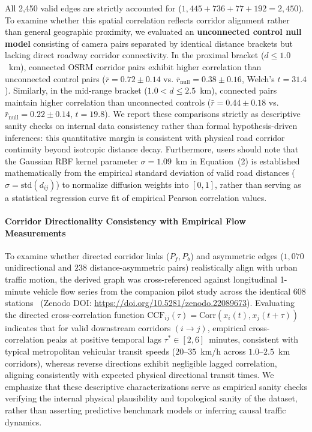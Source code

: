\documentclass[preprint,12pt]{elsarticle}
\begin{document}
All 2,450 valid edges are strictly accounted for ($1,445 + 736 + 77 + 192 = 2,450$). To examine whether this spatial correlation reflects corridor alignment rather than general geographic proximity, we evaluated an \textbf{unconnected control null model} consisting of camera pairs separated by identical distance brackets but lacking direct roadway corridor connectivity. In the proximal bracket ($d \le 1.0$~km), connected OSRM corridor pairs exhibit higher correlation than unconnected control pairs ($\bar{r} = 0.72 \pm 0.14$ vs. $\bar{r}_{\text{null}} = 0.38 \pm 0.16$, Welch's $t = 31.4$). Similarly, in the mid-range bracket ($1.0 < d \le 2.5$~km), connected pairs maintain higher correlation than unconnected controls ($\bar{r} = 0.44 \pm 0.18$ vs. $\bar{r}_{\text{null}} = 0.22 \pm 0.14$, $t = 19.8$). We report these comparisons strictly as descriptive sanity checks on internal data consistency rather than formal hypothesis-driven inferences: this quantitative margin is consistent with physical road corridor continuity beyond isotropic distance decay. Furthermore, users should note that the Gaussian RBF kernel parameter $\sigma = 1.09$~km in Equation~(2) is established mathematically from the empirical standard deviation of valid road distances ($\sigma = \text{std}(d_{ij})$) to normalize diffusion weights into $[0, 1]$, rather than serving as a statistical regression curve fit of empirical Pearson correlation values.

\paragraph{Corridor Directionality Consistency with Empirical Flow Measurements}
To examine whether directed corridor links ($P_f, P_b$) and asymmetric edges ($1,070$ unidirectional and $238$ distance-asymmetric pairs) realistically align with urban traffic motion, the derived graph was cross-referenced against longitudinal 1-minute vehicle flow series from the companion pilot study across the identical 608 stations~\cite{le2026urban} (Zenodo DOI: \url{https://doi.org/10.5281/zenodo.22089673}). Evaluating the directed cross-correlation function $\text{CCF}_{ij}(\tau) = \text{Corr}(x_i(t), x_j(t + \tau))$ indicates that for valid downstream corridors $(i \to j)$, empirical cross-correlation peaks at positive temporal lags $\tau^* \in [2, 6]$~minutes, consistent with typical metropolitan vehicular transit speeds ($20$--$35$~km/h across $1.0$--$2.5$~km corridors), whereas reverse directions exhibit negligible lagged correlation, aligning consistently with expected physical directional transit times. We emphasize that these descriptive characterizations serve as empirical sanity checks verifying the internal physical plausibility and topological sanity of the dataset, rather than asserting predictive benchmark models or inferring causal traffic dynamics.
\end{document}

